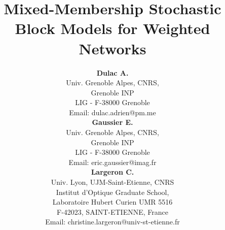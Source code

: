 \documentclass[letterpaper]{article}
\begin{document}
\title{Mixed-Membership Stochastic Block Models for Weighted Networks}


\author{{\bf Dulac A.}\\
Univ. Grenoble Alpes, CNRS,\\
Grenoble INP\\
LIG - F-38000 Grenoble\\
Email: dulac.adrien@pm.me\\
\And
{\bf Gaussier E.}\\
Univ. Grenoble Alpes, CNRS,\\
 Grenoble INP\\
LIG - F-38000 Grenoble\\
Email:  eric.gaussier@imag.fr\\
\And
{\bf Largeron C.}\\
Univ. Lyon, UJM-Saint-Etienne, CNRS\\
Institut d'Optique Graduate School,\\
Laboratoire Hubert Curien UMR 5516\\
F-42023, SAINT-ETIENNE, France\\ 
Email: christine.largeron@univ-st-etienne.fr\\
}	


\maketitle
\end{document}

